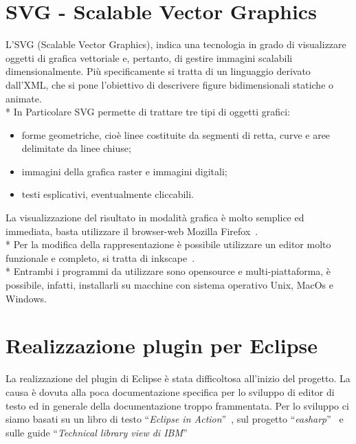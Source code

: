 \section{SVG - Scalable Vector Graphics} 
L'SVG (Scalable Vector Graphics), indica una tecnologia in grado di visualizzare oggetti 
di grafica vettoriale e, pertanto, di gestire immagini scalabili dimensionalmente.
Più specificamente si tratta di un linguaggio derivato dall'XML, che si pone l'obiettivo 
di descrivere figure bidimensionali statiche o animate. \\*
In Particolare SVG permette di trattare tre tipi di oggetti grafici:

\begin{itemize}
  \item forme geometriche, cioè linee costituite da segmenti di retta, curve e
  aree delimitate da linee chiuse;
  \item immagini della grafica raster e immagini digitali;
  \item testi esplicativi, eventualmente cliccabili.
\end{itemize} 
 
La visualizzazione del risultato in modalità grafica è molto semplice ed
immediata, basta utilizzare il browser-web Mozilla
Firefox~\cite{firefox_website:2}. \\*
Per la modifica della rappresentazione è possibile utilizzare un editor molto
funzionale e completo, si tratta di inkscape~\cite{Inkscape_website:3}. \\* 
Entrambi i programmi da utilizzare sono opensource e
multi-piattaforma, è possibile, infatti, installarli su macchine con sistema 
operativo Unix, MacOs e Windows.
     
      
\section{Realizzazione plugin per Eclipse} 

La realizzazione del plugin di Eclipse è stata difficoltosa all'inizio del
progetto. La causa è dovuta alla poca documentazione specifica per lo sviluppo
di editor di testo ed in generale della documentazione troppo frammentata.
Per lo sviluppo ci siamo basati su un libro di testo ``\emph{Eclipse in
Action}''~\cite{eclipse_action:4}, sul progetto ``\emph{easharp}''~\cite{esharp_website:5}
e sulle guide ``\emph{Technical library view di IBM}''~\cite{ibm_website:6}


